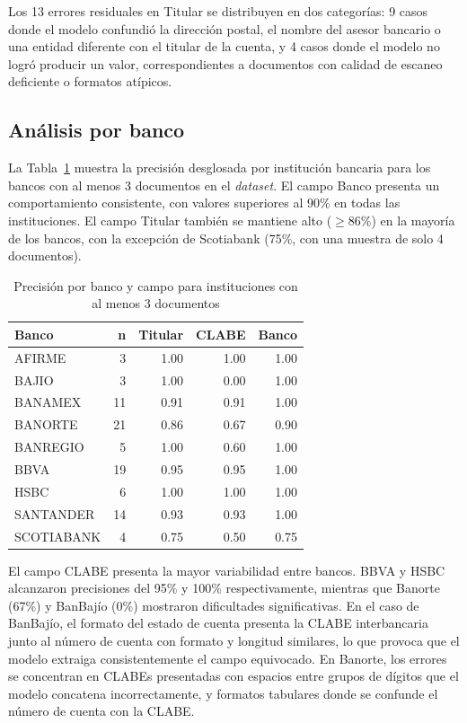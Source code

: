 Los 13 errores residuales en Titular se distribuyen en dos categorías: 9 casos donde el modelo confundió la dirección postal, el nombre del asesor bancario o una entidad diferente con el titular de la cuenta, y 4 casos donde el modelo no logró producir un valor, correspondientes a documentos con calidad de escaneo deficiente o formatos atípicos.

\subsection{Análisis por banco}

La Tabla~\ref{tab:heatmap-banco} muestra la precisión desglosada por institución bancaria para los bancos con al menos 3 documentos en el \textit{dataset}. El campo Banco presenta un comportamiento consistente, con valores superiores al 90\% en todas las instituciones. El campo Titular también se mantiene alto ($\geq$86\%) en la mayoría de los bancos, con la excepción de Scotiabank (75\%, con una muestra de solo 4 documentos).

\begin{table}[H]
\centering
\vspace{6pt}
\begin{tabular}{l r r r r}
\toprule
\textbf{Banco} & \textbf{n} & \textbf{Titular} & \textbf{CLABE} & \textbf{Banco} \\
\midrule
AFIRME     &  3 & 1.00 & 1.00 & 1.00 \\
BAJIO      &  3 & 1.00 & 0.00 & 1.00 \\
BANAMEX    & 11 & 0.91 & 0.91 & 1.00 \\
BANORTE    & 21 & 0.86 & 0.67 & 0.90 \\
BANREGIO   &  5 & 1.00 & 0.60 & 1.00 \\
BBVA       & 19 & 0.95 & 0.95 & 1.00 \\
HSBC       &  6 & 1.00 & 1.00 & 1.00 \\
SANTANDER  & 14 & 0.93 & 0.93 & 1.00 \\
SCOTIABANK &  4 & 0.75 & 0.50 & 0.75 \\
\bottomrule
\end{tabular}
\caption{Precisión por banco y campo para instituciones con al menos 3 documentos}
\label{tab:heatmap-banco}
\end{table}

El campo CLABE presenta la mayor variabilidad entre bancos. BBVA y HSBC alcanzaron precisiones del 95\% y 100\% respectivamente, mientras que Banorte (67\%) y BanBajío (0\%) mostraron dificultades significativas. En el caso de BanBajío, el formato del estado de cuenta presenta la CLABE interbancaria junto al número de cuenta con formato y longitud similares, lo que provoca que el modelo extraiga consistentemente el campo equivocado. En Banorte, los errores se concentran en CLABEs presentadas con espacios entre grupos de dígitos que el modelo concatena incorrectamente, y formatos tabulares donde se confunde el número de cuenta con la CLABE.

